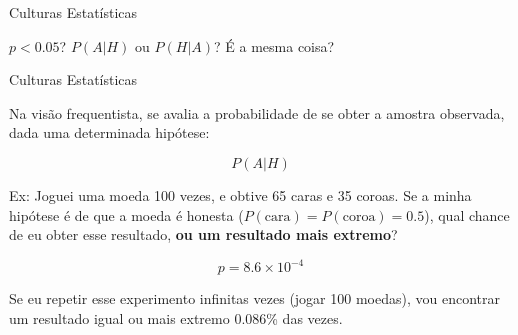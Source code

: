 \documentclass{beamer}\usepackage[]{graphicx}\usepackage[]{color}
\begin{document}
\begin{frame}{Culturas Estatísticas}

\begin{centering}

  $p < 0.05$? \pause
\vfill
  $P(A|H)$ ou $P(H|A)$? \pause
\vfill
  É a mesma coisa?

\end{centering}
 
\end{frame}



\begin{frame}{Culturas Estatísticas}

\begin{small}

Na visão frequentista, se avalia a probabilidade de se obter a amostra observada, dada uma determinada hipótese:

\begin{equation*}
P(A|H)
\end{equation*}

\alert{Ex:} Joguei uma moeda 100 vezes, e obtive 65 caras e 35 coroas. Se a minha hipótese é de que a moeda é honesta ($P(\text{cara}) = P(\text{coroa}) = 0.5$), qual chance de eu obter esse resultado, \textbf{ou um resultado mais extremo}?

\begin{equation*}
p =\ensuremath{8.6\times 10^{-4}}
\end{equation*}

Se eu repetir esse experimento infinitas vezes (jogar 100 moedas), vou encontrar um resultado igual ou mais extremo 0.086\% das vezes.

\end{small} 
 
\end{frame}
\end{document}
